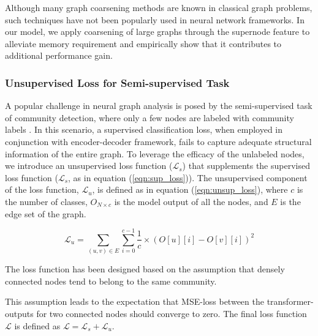 Although many graph coarsening methods are known in classical graph problems, such techniques have not been popularly used in neural network frameworks. In our model, we apply coarsening of large graphs through the supernode feature to alleviate memory requirement and empirically show that it contributes to additional performance gain.

%




\subsubsection{Unsupervised Loss for Semi-supervised Task}

\label{unsupervised}
A popular challenge in neural graph analysis is posed by the semi-supervised task of community detection, where only a few nodes are labeled with community labels \cite{zachary1977information}. In this scenario, a supervised classification loss, when employed in conjunction with encoder-decoder framework, fails to capture adequate structural information of the entire graph. To leverage the efficacy of the unlabeled nodes, we introduce an unsupervised loss function ($\mathcal{L}_s$) that supplements the supervised loss function ($\mathcal{L}_s$, as in equation (\ref{eqn:sup_loss})).
The unsupervised component of the loss function, $\mathcal{L}_u$, is defined as in equation (\ref{eqn:unsup_loss}), where $c$ is the number of classes, $O_{N\times c}$ is the model output of all the nodes, and $E$ is the edge set of the graph. 

\vspace*{-\baselineskip}
\begin{equation}
\mathcal{L}_u = \sum_{(u,v) \in E}\sum_{i=0}^{c-1}\frac{1}{c}\times(O[u][i]-O[v][i])^2
\label{eqn:unsup_loss}
\end{equation} 
\vspace{-.3cm}

The loss function has been designed based on the assumption that densely connected nodes tend to belong to the same community. 
\begin{comment}
Therefore, community-wise membership distribution should be similar for two connected nodes.
\end{comment}
This assumption leads to the expectation that MSE-loss between the transformer-outputs for two connected nodes should converge to zero. The final loss function $\mathcal{L}$ is defined as $\mathcal{L} = \mathcal{L}_s + \mathcal{L}_u$. 

